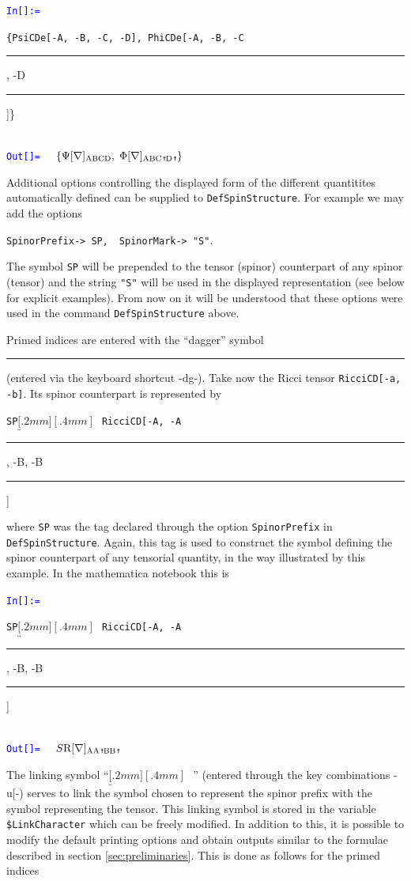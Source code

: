 \documentclass[final,3p,times,twocolumn]{elsarticle}
\newcounter{bla}
\newcommand{\dd}{\;\rule{0.018cm}{.15cm}\!\raisebox{1mm}{\rule{0.08cm}{.02cm}}}
\newcommand{\ddn}{\;\rule{0.018cm}{.25cm}\!\raisebox{1.7mm}{\rule{0.1cm}{.02cm}}}
\newcommand{\icode}[1]{{\scriptsize\tt #1}}
\newcounter{mathex}
\newcommand{\Mathsize}{\scriptsize}
\newcommand{\MathIn}[2]{ {\textcolor{blue}{\tt In[\arabic{#1}]:=} }\ { \tt #2 } \\[1mm] }
\newcommand{\MathOut}[1]{{\textcolor{blue}{\tt Out[\arabic{#1}]=}}\ \ }
\newcommand{\link}{$\underbracket[.2mm][.4mm]{\ \ }_{\ }$}
\begin{document}
\begin{flushleft} 
\Mathsize
{}
\MathIn{mathex}{\{PsiCDe[-A, -B, -C, -D], PhiCDe[-A, -B, -C\dd, -D\dd\;]\}}
\MathOut{mathex} $\{\Psi[\nabla]_{\rm A B C D},\;\Phi[\nabla]_{\rm A B C\dd D\dd}\}$
\end{flushleft}

Additional options controlling the displayed form of the different quantitites
automatically defined can be supplied to \icode{DefSpinStructure}.
For example we may add the options 

\vspace{.4cm} 
{ 
\Mathsize
{\tt SpinorPrefix-> SP,}\ \  {\tt SpinorMark-> "S"}.
\vspace{.4cm} 
}

\noindent
The symbol \icode{SP} will be prepended to the tensor (spinor) counterpart of
any spinor (tensor) and the string \icode{"S"} will be used in the displayed
representation (see below for explicit examples).
From now on it will be understood that these options were used in the 
command \icode{DefSpinStructure} above.

Primed indices are entered with the ``dagger'' symbol \icode{\ddn} 
(entered via the keyboard shortcut -dg-). 
Take now the Ricci tensor \icode{RicciCD[-a, -b]}. 
Its spinor counterpart is represented by 
\icode{SP\!\link RicciCD[-A, -A\dd, -B, -B\dd]}
where \icode{SP} was the tag declared through the option \icode{SpinorPrefix}
in \icode{DefSpinStructure}. Again, this tag is used to construct the symbol
defining the spinor counterpart of any tensorial quantity, in the way
illustrated by this example. In the mathematica notebook this is  

\begin{flushleft}
\Mathsize
{}
\MathIn{mathex}{SP\!\link RicciCD[-A, -A\dd, -B, -B\dd]}
\MathOut{mathex} $S{\rm R}[\nabla]_{\rm A A\dd B B\dd}$
\end{flushleft}

\noindent
The linking symbol ``\link'' (entered through
the key combinations -u[-) serves to link the symbol
chosen to represent the spinor prefix with the symbol representing the tensor.
This linking symbol is stored in the variable \icode{\$LinkCharacter} which
can be freely modified.
In addition to this, it is possible to modify the default printing options and
obtain outputs similar to the formulae described in section
\ref{sec:preliminaries}. This is done as follows for the primed indices
\end{document}
